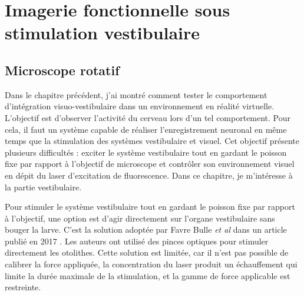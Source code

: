 \chapter[Imagerie sous stimulation vestibulaire]{Imagerie fonctionnelle sous \\ stimulation vestibulaire}\label{chapIII}



\section{Microscope rotatif}

Dans le chapitre précédent, j'ai montré comment tester le comportement d'intégration visuo-vestibulaire dans un environnement en réalité virtuelle. L'objectif est d'observer l'activité du cerveau lors d'un tel comportement. Pour cela, il faut un système capable de réaliser l'enregistrement neuronal en même temps que la stimulation des systèmes vestibulaire et visuel. Cet objectif présente plusieurs difficultés : exciter le système vestibulaire tout en gardant le poisson fixe par rapport à l'objectif de microscope et contrôler son environnement visuel en dépit du laser d'excitation de fluorescence. Dans ce chapitre, je m'intéresse à la partie vestibulaire.

Pour stimuler le système vestibulaire tout en gardant le poisson fixe par rapport à l'objectif, une option est d'agir directement sur l'organe vestibulaire sans bouger la larve. C'est la solution adoptée par Favre Bulle \emph{et al} dans un article publié en 2017 \cite{favre-bulle_optical_2017}. Les auteurs ont utilisé des pinces optiques pour stimuler directement les otolithes. Cette solution est limitée, car il n'est pas possible de calibrer la force appliquée, la concentration du laser produit un échauffement qui limite la durée maximale de la stimulation, et la gamme de force applicable est restreinte.

